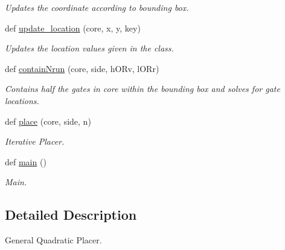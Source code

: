 \begin{DoxyCompactItemize}
\begin{DoxyCompactList}\small\item\em Updates the coordinate according to bounding box. \end{DoxyCompactList}\item 
def \hyperlink{namespacegqp__placer_a600dd4547705a5709ee16989f13591d5}{update\+\_\+location} (core, x, y, key)\hypertarget{namespacegqp__placer_a600dd4547705a5709ee16989f13591d5}{}\label{namespacegqp__placer_a600dd4547705a5709ee16989f13591d5}

\begin{DoxyCompactList}\small\item\em Updates the location values given in the class. \end{DoxyCompactList}\item 
def \hyperlink{namespacegqp__placer_a09d4a51106fd3e91feb0cd3656ea7f4b}{contain\+Nrun} (core, side, h\+O\+Rv, l\+O\+Rr)\hypertarget{namespacegqp__placer_a09d4a51106fd3e91feb0cd3656ea7f4b}{}\label{namespacegqp__placer_a09d4a51106fd3e91feb0cd3656ea7f4b}

\begin{DoxyCompactList}\small\item\em Contains half the gates in core within the bounding box and solves for gate locations. \end{DoxyCompactList}\item 
def \hyperlink{namespacegqp__placer_ab943530c8a95de269a92af84899cb424}{place} (core, side, n)\hypertarget{namespacegqp__placer_ab943530c8a95de269a92af84899cb424}{}\label{namespacegqp__placer_ab943530c8a95de269a92af84899cb424}

\begin{DoxyCompactList}\small\item\em Iterative Placer. \end{DoxyCompactList}\item 
def \hyperlink{namespacegqp__placer_ab87a36d6fec84b4738f9a09178b2d90e}{main} ()\hypertarget{namespacegqp__placer_ab87a36d6fec84b4738f9a09178b2d90e}{}\label{namespacegqp__placer_ab87a36d6fec84b4738f9a09178b2d90e}

\begin{DoxyCompactList}\small\item\em Main. \end{DoxyCompactList}\end{DoxyCompactItemize}


\subsection{Detailed Description}
General Quadratic Placer. 
